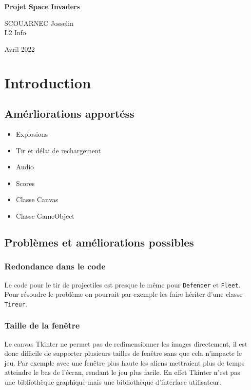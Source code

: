 \documentclass[12pt]{article}
\newcommand{\pagesection}{\newpage\section}
\begin{document}
\begin{center}
	
	\sffamily

	\Huge
	\textbf{Projet Space Invaders}

	\vspace{1.5cm}
	\Large
	SCOUARNEC Josselin \\ L2 Info

	\vspace{0.5cm}
	\Large
	Avril 2022

	\vfill
\end{center}


\tableofcontents




\pagesection{Introduction}
	

	\subsection{Amérliorations apportéss}

		\begin{itemize}
			\item Explosions
			\item Tir et délai de rechargement
			\item Audio
			\item Scores
			\item Classe Canvas
			\item Classe GameObject

		\end{itemize}


	\subsection{Problèmes et améliorations possibles}

		\subsubsection{Redondance dans le code}
			Le code pour le tir de projectiles est presque le même pour \texttt{Defender} et \texttt{Fleet}. Pour résoudre le problème on pourrait par exemple les faire hériter d'une classe \texttt{Tireur}. 

		\subsubsection{Taille de la fenêtre}
			Le canvas Tkinter ne permet pas de redimensionner les images directement, il est donc difficile de supporter plusieurs tailles de fenêtre sans que cela n'impacte le jeu. Par exemple avec une fenêtre plus haute les aliens mettraient plus de temps atteindre le bas de l'écran, rendant le jeu plus facile. En effet Tkinter n'est pas une bibliothèque graphique mais une bibliothèque d'interface utilisateur.
\end{document}
